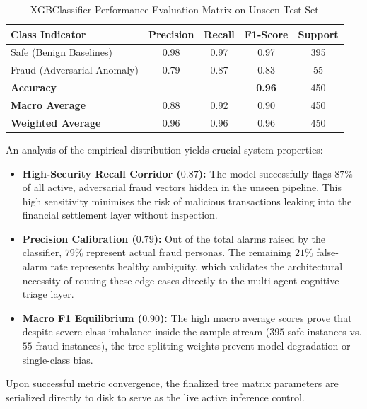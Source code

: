 \documentclass[12pt]{report}
\begin{document}
\begin{table}[h]
    \centering
    \caption{XGBClassifier Performance Evaluation Matrix on Unseen Test Set}
    \label{tab:classification_report}
    \small
    \begin{tabular}{lcccc}
        \hline
        \textbf{Class Indicator} & \textbf{Precision} & \textbf{Recall} & \textbf{F1-Score} & \textbf{Support} \\ \hline
        Safe (Benign Baselines)  & 0.98               & 0.97            & 0.97              & 395              \\
        Fraud (Adversarial Anomaly) & 0.79               & 0.87            & 0.83              & 55               \\ \hline
        \textbf{Accuracy}        &                    &                 & \textbf{0.96}     & 450              \\
        \textbf{Macro Average}   & 0.88               & 0.92            & 0.90              & 450              \\
        \textbf{Weighted Average}& 0.96               & 0.96            & 0.96              & 450              \\ \hline
    \end{tabular}
\end{table}
An analysis of the empirical distribution yields crucial system properties:
\begin{itemize}
    \item \textbf{High-Security Recall Corridor ($0.87$):} The model successfully flags $87\%$ of all active, adversarial fraud vectors hidden in the unseen pipeline. This high sensitivity minimises the risk of malicious transactions leaking into the financial settlement layer without inspection.
    \item \textbf{Precision Calibration ($0.79$):} Out of the total alarms raised by the classifier, $79\%$ represent actual fraud personas. The remaining $21\%$ false-alarm rate represents healthy ambiguity, which validates the architectural necessity of routing these edge cases directly to the multi-agent cognitive triage layer.
    \item \textbf{Macro F1 Equilibrium ($0.90$):} The high macro average scores prove that despite severe class imbalance inside the sample stream ($395$ safe instances vs. $55$ fraud instances), the tree splitting weights prevent model degradation or single-class bias.
\end{itemize}
Upon successful metric convergence, the finalized tree matrix parameters are serialized directly to disk to serve as the live active inference control.
\end{document}

